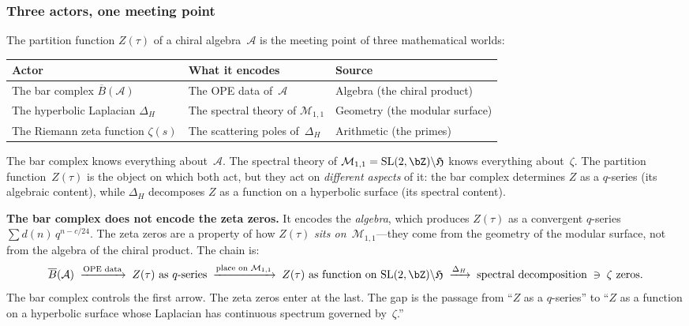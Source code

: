 \documentclass[11pt]{article}
\newcommand{\cA}{\mathcal{A}}
\newcommand{\cM}{\mathcal{M}}
\newcommand{\barB}{\overline{B}}
\begin{document}
\subsubsection{Three actors, one meeting point}

The partition function $Z(\tau)$ of a chiral algebra~$\cA$ is
the meeting point of three mathematical worlds:

\begin{center}
\small
\renewcommand{\arraystretch}{1.4}
\begin{tabular}{@{}lll@{}}
\textbf{Actor} & \textbf{What it encodes} & \textbf{Source} \\
\hline
The bar complex $\barB(\cA)$
  & The OPE data of~$\cA$
  & Algebra (the chiral product) \\[3pt]
The hyperbolic Laplacian $\Delta_H$
  & The spectral theory of $\cM_{1,1}$
  & Geometry (the modular surface) \\[3pt]
The Riemann zeta function $\zeta(s)$
  & The scattering poles of~$\Delta_H$
  & Arithmetic (the primes)
\end{tabular}
\end{center}

\noindent The bar complex knows everything about~$\cA$.  The
spectral theory of $\cM_{1,1} = \mathrm{SL}(2,\bZ)\backslash
\mathfrak{H}$ knows everything about~$\zeta$.  The partition
function~$Z(\tau)$ is the object on which both act, but
they act on \emph{different aspects} of it: the bar complex
determines $Z$ as a $q$-series (its algebraic content), while
$\Delta_H$ decomposes $Z$ as a function on a hyperbolic
surface (its spectral content).

\textbf{The bar complex does not encode the zeta zeros.}
It encodes the \emph{algebra}, which produces $Z(\tau)$
as a convergent $q$-series $\sum d(n)\, q^{n - c/24}$.
The zeta zeros are a property of how $Z(\tau)$ \emph{sits
on~$\cM_{1,1}$}---they come from the geometry of the modular
surface, not from the algebra of the chiral product.  The
chain is:
\[
  \barB(\cA)
  \;\xrightarrow{\text{OPE data}}\;
  Z(\tau) \text{ as $q$-series}
  \;\xrightarrow{\text{place on $\cM_{1,1}$}}\;
  Z(\tau) \text{ as function on $\mathrm{SL}(2,\bZ)
  \backslash\mathfrak{H}$}
  \;\xrightarrow{\Delta_H}\;
  \text{spectral decomposition}
  \;\ni\; \zeta\text{ zeros}.
\]
The bar complex controls the first arrow.  The zeta zeros
enter at the last.  The gap is the passage from ``$Z$ as a
$q$-series'' to ``$Z$ as a function on a hyperbolic surface
whose Laplacian has continuous spectrum governed by~$\zeta$.''
\end{document}
